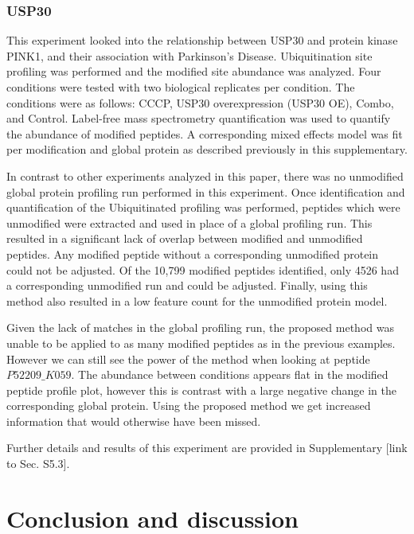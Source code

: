 \documentclass[mcp]{article}
\numberwithin{figure}{section} %
\numberwithin{table}{section}
\def\todo#1{{\color{red}[#1]}}
\begin{document}
\subsubsection*{USP30}

This experiment looked into the relationship between USP30 and protein kinase PINK1, and their association with Parkinson’s Disease. Ubiquitination site profiling was performed and the modified site abundance was analyzed. Four conditions were tested with two biological replicates per condition. The conditions were as follows: CCCP, USP30 overexpression (USP30 OE), Combo, and Control. Label-free mass spectrometry quantification was used to quantify the abundance of modified peptides. A corresponding mixed effects model was fit per modification and global protein as described previously in this supplementary. 

In contrast to other experiments analyzed in this paper, there was no unmodified global protein profiling run performed in this experiment. Once identification and quantification of the Ubiquitinated profiling was performed, peptides which were unmodified were extracted and used in place of a global profiling run. This resulted in a significant lack of overlap between modified and unmodified peptides. Any modified peptide without a corresponding unmodified protein could not be adjusted. Of the 10,799 modified peptides identified, only 4526 had a corresponding unmodified run and could be adjusted. Finally, using this method also resulted in a low feature count for the unmodified protein model.

Given the lack of matches in the global profiling run, the proposed method was unable to be applied to as many modified peptides as in the previous examples. However we can still see the power of the method when looking at peptide $P52209\_K059$. The abundance between conditions appears flat in the modified peptide profile plot, however this is contrast with a large negative change in the corresponding global protein. Using the proposed method we get increased information that would otherwise have been missed.

Further details and results of this experiment are provided in Supplementary \todo{link to Sec. S5.3}. 

\section{Conclusion and discussion}
\end{document}
